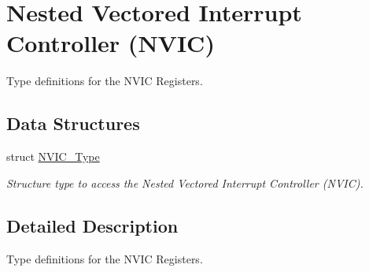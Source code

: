 \hypertarget{group___c_m_s_i_s___n_v_i_c}{}\section{Nested Vectored Interrupt Controller (N\+V\+IC)}
\label{group___c_m_s_i_s___n_v_i_c}


Type definitions for the N\+V\+IC Registers.  


\subsection*{Data Structures}
\begin{DoxyCompactItemize}
\item 
struct \mbox{\hyperlink{struct_n_v_i_c___type}{N\+V\+I\+C\+\_\+\+Type}}
\begin{DoxyCompactList}\small\item\em Structure type to access the Nested Vectored Interrupt Controller (N\+V\+IC). \end{DoxyCompactList}\end{DoxyCompactItemize}


\subsection{Detailed Description}
Type definitions for the N\+V\+IC Registers. 

